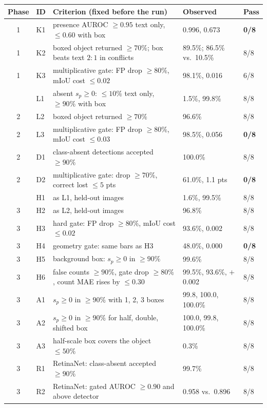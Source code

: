 \begin{tabular*}{\textwidth}{@{\extracolsep{\fill}}cllll@{}}
\toprule
Phase & ID & Criterion (fixed before the run) & Observed & Pass \\
\midrule
1 & K1 & presence AUROC $\geq 0.95$ text only, $\leq 0.60$ with box & 0.996, 0.673 & \textbf{0/8} \\
1 & K2 & boxed object returned $\geq 70\%$; box beats text $2{:}1$ in conflicts & 89.5\%; 86.5\% vs.\ 10.5\% & 8/8 \\
1 & K3 & multiplicative gate: FP drop $\geq 80\%$, mIoU cost $\leq 0.02$ & 98.1\%, 0.016 & 6/8 \\
\addlinespace[2pt]
2 & L1 & absent $s_p \geq 0$: $\leq 10\%$ text only, $\geq 90\%$ with box & 1.5\%, 99.8\% & 8/8 \\
2 & L2 & boxed object returned $\geq 70\%$ & 96.6\% & 8/8 \\
2 & L3 & multiplicative gate: FP drop $\geq 80\%$, mIoU cost $\leq 0.03$ & 98.5\%, 0.056 & \textbf{0/8} \\
2 & D1 & class-absent detections accepted $\geq 90\%$ & 100.0\% & 8/8 \\
2 & D2 & multiplicative gate: drop $\geq 70\%$, correct lost $\leq 5$ pts & 61.0\%, 1.1 pts & \textbf{0/8} \\
\addlinespace[2pt]
3 & H1 & as L1, held-out images & 1.6\%, 99.5\% & 8/8 \\
3 & H2 & as L2, held-out images & 96.8\% & 8/8 \\
3 & H3 & hard gate: FP drop $\geq 80\%$, mIoU cost $\leq 0.02$ & 93.6\%, 0.002 & 8/8 \\
3 & H4 & geometry gate: same bars as H3 & 48.0\%, 0.000 & \textbf{0/8} \\
3 & H5 & background box: $s_p \geq 0$ in $\geq 90\%$ & 99.6\% & 8/8 \\
3 & H6 & false counts $\geq 90\%$, gate drop $\geq 80\%$, count MAE rises by $\leq 0.30$ & 99.5\%, 93.6\%, $+$0.002 & 8/8 \\
3 & A1 & $s_p \geq 0$ in $\geq 90\%$ with 1, 2, 3 boxes & 99.8, 100.0, 100.0\% & 8/8 \\
3 & A2 & $s_p \geq 0$ in $\geq 90\%$ for half, double, shifted box & 100.0, 99.8, 100.0\% & 8/8 \\
3 & A3 & half-scale box covers the object $\leq 50\%$ & 0.3\% & 8/8 \\
3 & R1 & RetinaNet: class-absent accepted $\geq 90\%$ & 99.7\% & 8/8 \\
3 & R2 & RetinaNet: gated AUROC $\geq 0.90$ and above detector & 0.958 vs.\ 0.896 & 8/8 \\

\end{tabular*}
